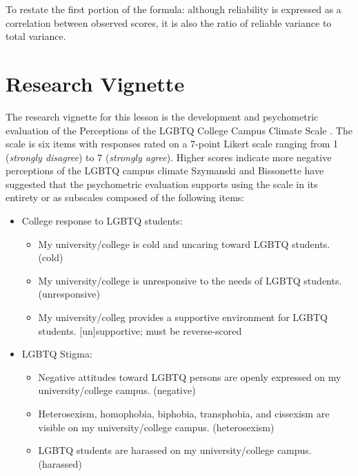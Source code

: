 \documentclass[
  english,
]{book}
\providecommand{\tightlist}{%
  \setlength{\itemsep}{0pt}\setlength{\parskip}{0pt}}
\begin{document}
To restate the first portion of the formula: although reliability is expressed as a correlation between observed scores, it is also the ratio of reliable variance to total variance.

\hypertarget{research-vignette-1}{%
\section{Research Vignette}\label{research-vignette-1}}

The research vignette for this lesson is the development and psychometric evaluation of the Perceptions of the LGBTQ College Campus Climate Scale \citeyearpar{szymanski_perceptions_2020}. The scale is six items with responses rated on a 7-point Likert scale ranging from 1 (\emph{strongly disagree}) to 7 (\emph{strongly agree}). Higher scores indicate more negative perceptions of the LGBTQ campus climate Szymanski and Bissonette have suggested that the psychometric evaluation supports using the scale in its entirety or as subscales composed of the following items:

\begin{itemize}
\tightlist
\item
  College response to LGBTQ students:

  \begin{itemize}
  \tightlist
  \item
    My university/college is cold and uncaring toward LGBTQ students. (cold)
  \item
    My university/college is unresponsive to the needs of LGBTQ students. (unresponsive)
  \item
    My university/colleg provides a supportive environment for LGBTQ students. {[}un{]}supportive; must be reverse-scored
  \end{itemize}
\item
  LGBTQ Stigma:

  \begin{itemize}
  \tightlist
  \item
    Negative attitudes toward LGBTQ persons are openly expressed on my university/college campus. (negative)
  \item
    Heterosexism, homophobia, biphobia, transphobia, and cissexism are visible on my university/college campus. (heterosexism)
  \item
    LGBTQ students are harassed on my university/college campus. (harassed)
  \end{itemize}
\end{itemize}
\end{document}
